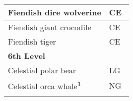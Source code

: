 \begin{longtable}{llll}
\multicolumn{1}{|p{3.326in}|}{\begin{minipage}[t]{3.326in}\raggedright
Fiendish dire wolverine\end{minipage}} & \multicolumn{3}{p{0.601in}|}{\begin{minipage}[t]{0.601in}\raggedright
CE\end{minipage}}\\
\hline
\multicolumn{1}{|p{3.326in}|}{\begin{minipage}[t]{3.326in}\raggedright
Fiendish giant crocodile\end{minipage}} & \multicolumn{3}{p{0.601in}|}{\begin{minipage}[t]{0.601in}\raggedright
CE\end{minipage}}\\
\hline
\multicolumn{1}{|p{3.326in}|}{\begin{minipage}[t]{3.326in}\raggedright
Fiendish tiger\end{minipage}} & \multicolumn{3}{p{0.601in}|}{\begin{minipage}[t]{0.601in}\raggedright
CE\end{minipage}}\\
\hline
\multicolumn{1}{|p{3.326in}|}{\begin{minipage}[t]{3.326in}\raggedright
\textbf{6th Level}\end{minipage}} & \multicolumn{3}{p{0.601in}|}{\begin{minipage}[t]{0.601in}\raggedright
\end{minipage}}\\
\hline
\multicolumn{1}{|p{3.326in}|}{\begin{minipage}[t]{3.326in}\raggedright
Celestial polar bear\end{minipage}} & \multicolumn{3}{p{0.601in}|}{\begin{minipage}[t]{0.601in}\raggedright
LG\end{minipage}}\\
\hline
\multicolumn{1}{|p{3.326in}|}{\begin{minipage}[t]{3.326in}\raggedright
Celestial orca whale\textsuperscript{\textbf{1}}\end{minipage}} & \multicolumn{3}{p{0.601in}|}{\begin{minipage}[t]{0.601in}\raggedright
NG\end{minipage}}\\
\hline
\multicolumn{1}{|p{3.326in}|}{\begin{minipage}[t]{3.326in}\raggedright

\end{minipage}}
\end{longtable}
